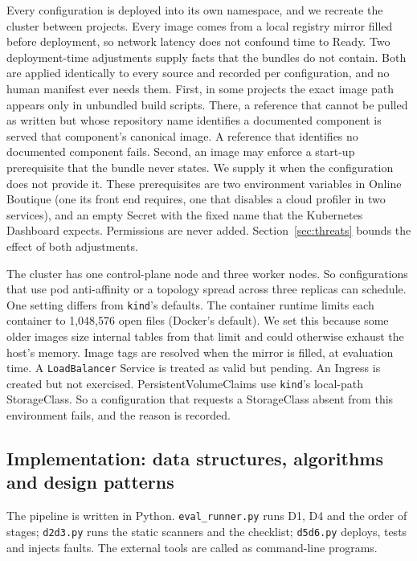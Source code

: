 Every configuration is deployed into its own namespace, and we recreate the cluster between projects. Every image comes from a local registry mirror filled before deployment, so network latency does not confound time to Ready. Two deployment-time adjustments supply facts that the bundles do not contain. Both are applied identically to every source and recorded per configuration, and no human manifest ever needs them. First, in some projects the exact image path appears only in unbundled build scripts. There, a reference that cannot be pulled as written but whose repository name identifies a documented component is served that component's canonical image. A reference that identifies no documented component fails. Second, an image may enforce a start-up prerequisite that the bundle never states. We supply it when the configuration does not provide it. These prerequisites are two environment variables in Online Boutique (one its front end requires, one that disables a cloud profiler in two services), and an empty Secret with the fixed name that the Kubernetes Dashboard expects. Permissions are never added. Section~\ref{sec:threats} bounds the effect of both adjustments.

The cluster has one control-plane node and three worker nodes. So configurations that use pod anti-affinity or a topology spread across three replicas can schedule. One setting differs from \texttt{kind}'s defaults. The container runtime limits each container to 1,048,576 open files (Docker's default). We set this because some older images size internal tables from that limit and could otherwise exhaust the host's memory. Image tags are resolved when the mirror is filled, at evaluation time. A \texttt{LoadBalancer} Service is treated as valid but pending. An Ingress is created but not exercised. PersistentVolumeClaims use \texttt{kind}'s local-path StorageClass. So a configuration that requests a StorageClass absent from this environment fails, and the reason is recorded.

\subsection{Implementation: data structures, algorithms and design patterns}\label{sec:setup-impl}

The pipeline is written in Python. \texttt{eval\_runner.py} runs D1, D4 and the order of stages; \texttt{d2d3.py} runs the static scanners and the checklist; \texttt{d5d6.py} deploys, tests and injects faults. The external tools are called as command-line programs.

